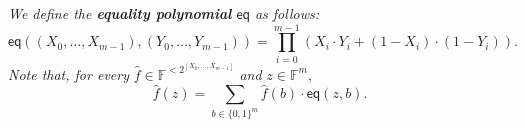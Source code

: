 
\begin{definition}[3.4]
    \textit{We define the \textbf{equality polynomial} $\mathsf{eq}$ as follows:}
    \[
    \mathsf{eq}((X_0, \ldots, X_{m-1}), (Y_0, \ldots, Y_{m-1})) = \prod_{i=0}^{m-1} \left( X_i \cdot Y_i + (1 - X_i) \cdot (1 - Y_i) \right).
    \]
    \textit{Note that, for every} $\hat{f} \in \mathbb{F}^{<2^{[X_0,\ldots,X_{m-1}]}}$ \textit{and} $z \in \mathbb{F}^m$,
    \[
    \hat{f}(z) = \sum_{b \in \{0,1\}^m} \hat{f}(b) \cdot \mathsf{eq}(z, b).
    \]
    \end{definition}